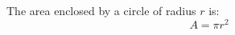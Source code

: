 \documentclass{article}
\begin{document}
The area enclosed by a circle of radius $r$ is:
\begin{equation}
  A = \pi r^2
\end{equation}
\end{document}
